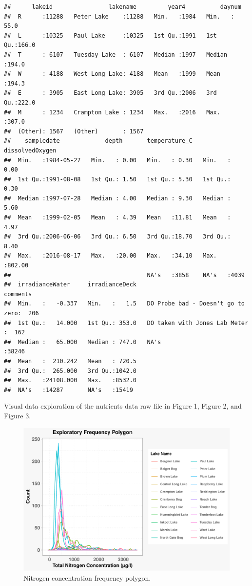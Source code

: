 \documentclass[12pt,]{article}
\begin{document}
\begin{verbatim}
##      lakeid                lakename         year4          daynum     
##  R      :11288   Peter Lake    :11288   Min.   :1984   Min.   : 55.0  
##  L      :10325   Paul Lake     :10325   1st Qu.:1991   1st Qu.:166.0  
##  T      : 6107   Tuesday Lake  : 6107   Median :1997   Median :194.0  
##  W      : 4188   West Long Lake: 4188   Mean   :1999   Mean   :194.3  
##  E      : 3905   East Long Lake: 3905   3rd Qu.:2006   3rd Qu.:222.0  
##  M      : 1234   Crampton Lake : 1234   Max.   :2016   Max.   :307.0  
##  (Other): 1567   (Other)       : 1567                                 
##    sampledate             depth       temperature_C   dissolvedOxygen 
##  Min.   :1984-05-27   Min.   : 0.00   Min.   : 0.30   Min.   :  0.00  
##  1st Qu.:1991-08-08   1st Qu.: 1.50   1st Qu.: 5.30   1st Qu.:  0.30  
##  Median :1997-07-28   Median : 4.00   Median : 9.30   Median :  5.60  
##  Mean   :1999-02-05   Mean   : 4.39   Mean   :11.81   Mean   :  4.97  
##  3rd Qu.:2006-06-06   3rd Qu.: 6.50   3rd Qu.:18.70   3rd Qu.:  8.40  
##  Max.   :2016-08-17   Max.   :20.00   Max.   :34.10   Max.   :802.00  
##                                       NA's   :3858    NA's   :4039    
##  irradianceWater     irradianceDeck                                comments    
##  Min.   :   -0.337   Min.   :   1.5   DO Probe bad - Doesn't go to zero:  206  
##  1st Qu.:   14.000   1st Qu.: 353.0   DO taken with Jones Lab Meter    :  162  
##  Median :   65.000   Median : 747.0   NA's                             :38246  
##  Mean   :  210.242   Mean   : 720.5                                            
##  3rd Qu.:  265.000   3rd Qu.:1042.0                                            
##  Max.   :24108.000   Max.   :8532.0                                            
##  NA's   :14287       NA's   :15419
\end{verbatim}

Visual data exploration of the nutrients data raw file in Figure 1,
Figure 2, and Figure 3.

\begin{figure}
\centering
\includegraphics{Eadala_ENV872_Project_files/figure-latex/fig1-1.pdf}
\caption{Nitrogen concentration frequency polygon.}
\end{figure}
\end{document}
